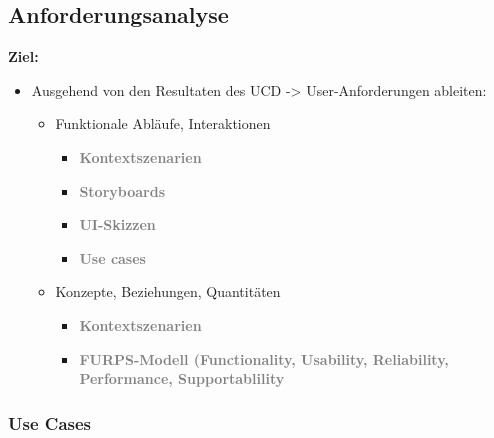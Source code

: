 \documentclass{article}
\begin{document}
\subsection{Anforderungsanalyse}

\textbf{Ziel:}\\
\begin{itemize}
	\item Ausgehend von den Resultaten des UCD -> User-Anforderungen ableiten:
	\begin{itemize}
		\item Funktionale Abläufe, Interaktionen 
		\begin{itemize}
			\item \textcolor {gray} {\textbf{Kontextszenarien}}
			\item \textcolor {gray} {\textbf{Storyboards}}
			\item \textcolor {gray} {\textbf{UI-Skizzen}}
			\item \textcolor {gray} {\textbf{Use cases}}
		\end{itemize}
		\item Konzepte, Beziehungen, Quantitäten
		\begin{itemize}
			\item \textcolor {gray} {\textbf{Kontextszenarien}}
		\end{itemize}
		\begin{itemize}
			\item \textcolor {gray} {\textbf{FURPS-Modell (Functionality, Usability, Reliability, Performance, Supportablility}}
		
		\end{itemize}				
		
	\end{itemize}
\end{itemize}


\subsubsection{Use Cases}
\end{document}
